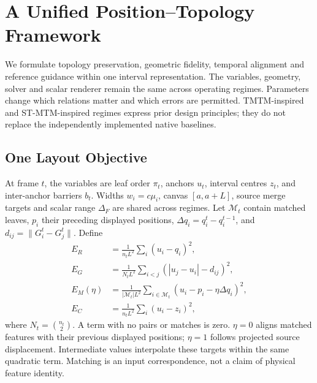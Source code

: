 \section{A Unified Position--Topology Framework}\label{sec:framework}
We formulate topology preservation, geometric fidelity, temporal alignment and reference guidance within one interval representation. The variables, geometry, solver and scalar renderer remain the same across operating regimes. Parameters change which relations matter and which errors are permitted. TMTM-inspired and ST-MTM-inspired regimes express prior design principles; they do not replace the independently implemented native baselines.

\subsection{One Layout Objective}
At frame $t$, the variables are leaf order $\pi_t$, anchors $u_t$, interval centres $z_t$, and inter-anchor barriers $b_t$. Widths $w_i=c\mu_i$, canvas $[a,a+L]$, source merge targets and scalar range $\Delta_F$ are shared across regimes. Let $\mathcal M_t$ contain matched leaves, $p_i$ their preceding displayed positions, $\Delta q_i=q_i^t-q_i^{t-1}$, and $d_{ij}=\|G_i^t-G_j^t\|$. Define
\begin{equation}
\begin{aligned}
 E_R &= \frac{1}{n_tL^2}\sum_i(u_i-q_i)^2,\\
 E_G &= \frac{1}{N_tL^2}\sum_{i<j}(|u_j-u_i|-d_{ij})^2,\\
 E_M(\eta) &= \frac{1}{|\mathcal M_t|L^2}\sum_{i\in\mathcal M_t}(u_i-p_i-\eta\Delta q_i)^2,\\
 E_C &= \frac{1}{n_tL^2}\sum_i(u_i-z_i)^2,
\end{aligned}\label{eq:unified_terms}
\end{equation}
where $N_t=\binom{n_t}{2}$. A term with no pairs or matches is zero. $\eta=0$ aligns matched features with their previous displayed positions; $\eta=1$ follows projected source displacement. Intermediate values interpolate these targets within the same quadratic term. Matching is an input correspondence, not a claim of physical feature identity.

